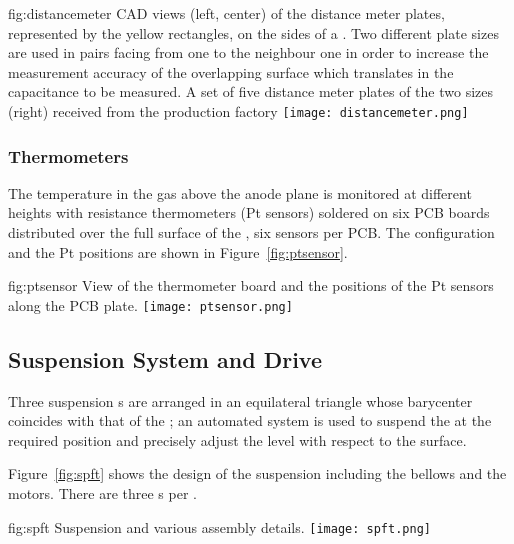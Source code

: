 \begin{dunefigure}{fig:distancemeter}
{CAD views (left, center) of the distance meter plates, represented by the yellow rectangles, on the sides of a . Two different plate sizes are used in pairs facing from one  to the neighbour one in order to increase the measurement accuracy of the overlapping surface which translates in the capacitance to be measured. A set of five distance meter plates of the two sizes (right) received from the production factory}
\texttt{[image: distancemeter.png]}
\end{dunefigure}


\subsubsection{Thermometers}

The temperature in the gas above the anode plane is monitored at different heights with resistance thermometers (Pt sensors) soldered on  six PCB boards distributed over the full surface of the , six 
sensors per PCB. The configuration and the Pt positions are shown in Figure~\ref{fig:ptsensor}.

\begin{dunefigure}{fig:ptsensor}
{View of the thermometer board and the positions of the Pt sensors along the PCB plate.}
\texttt{[image: ptsensor.png]}
\end{dunefigure}

\subsection{Suspension System and Drive}
\label{sec:fddp-crp-suspension}

Three suspension \fdth{}s are arranged in an equilateral triangle whose barycenter coincides with that of the ; an automated system is used to suspend the  at the required position and precisely adjust the  level with respect to the \lar surface.

Figure~\ref{fig:spft} shows the design of the suspension \fdth including the bellows and the motors. There are three \fdth{}s per .

\begin{dunefigure}{fig:spft}
{Suspension \fdth and various assembly details.}
\texttt{[image: spft.png]}
\end{dunefigure}

